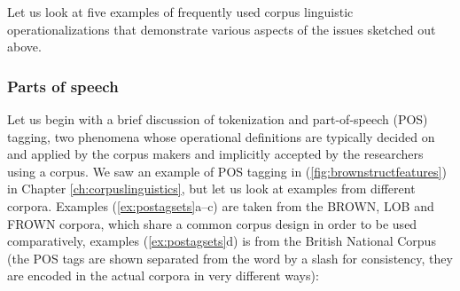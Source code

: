 Let us look at five examples of frequently used corpus linguistic operationalizations that demonstrate various aspects of the issues sketched out above.

\subsubsection{Parts of speech}
\label{sec:partsofspeech}

Let us begin with a brief discussion of tokenization and part-of-speech (POS) tagging, two phenomena whose operational definitions are typically decided on and applied by the corpus makers and implicitly accepted by the researchers using a corpus. We saw an example of POS tagging in (\ref{fig:brownstructfeatures}) in Chapter \ref{ch:corpuslinguistics}, but let us look at examples from different corpora. Examples (\ref{ex:postagsets}a--c) are taken from the BROWN, LOB and FROWN corpora, which share a common corpus design in order to be used comparatively, examples (\ref{ex:postagsets}d) is from the British National Corpus (the POS tags are shown separated from the word by a slash for consistency, they are encoded in the actual corpora in very different ways):

